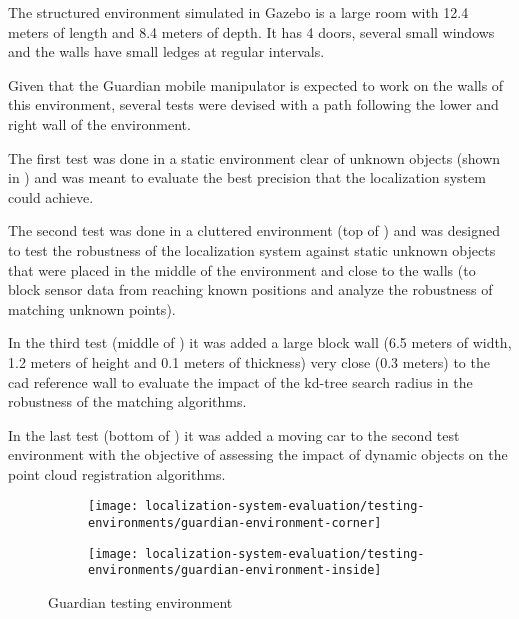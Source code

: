 The structured environment simulated in Gazebo is a large room with 12.4 meters of length and 8.4 meters of depth. It has 4 doors, several small windows and the walls have small ledges at regular intervals.

Given that the Guardian mobile manipulator is expected to work on the walls of this environment, several tests were devised with a path following the lower and right wall of the environment.

The first test was done in a static environment clear of unknown objects (shown in ) and was meant to evaluate the best precision that the localization system could achieve.

The second test was done in a cluttered environment (top of ) and was designed to test the robustness of the localization system against static unknown objects that were placed in the middle of the environment and close to the walls (to block sensor data from reaching known positions and analyze the robustness of matching unknown points).

In the third test (middle of ) it was added a large block wall (6.5 meters of width, 1.2 meters of height and 0.1 meters of thickness) very close (0.3 meters) to the \gls{cad} reference wall to evaluate the impact of the kd-tree search radius in the robustness of the matching algorithms.

In the last test (bottom of ) it was added a moving car to the second test environment with the objective of assessing the impact of dynamic objects on the point cloud registration algorithms.


\begin{figure}[H]
	\centering
	\begin{subfigure}[ht]{0.33\textwidth}
		\centering
		\texttt{[image: localization-system-evaluation/testing-environments/guardian-environment-corner]}
	\end{subfigure}
	\begin{subfigure}[ht]{0.33\textwidth}
		\centering
		\texttt{[image: localization-system-evaluation/testing-environments/guardian-environment-inside]}
	\end{subfigure}
	\caption{Guardian testing environment}
	\label{fig:localization-system-evaluation_guardian-tests-environment}
\end{figure}

